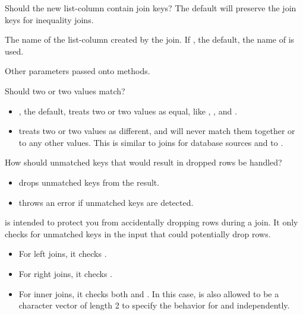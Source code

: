 \documentclass[a4paper]{book}
\begin{document}
\begin{Arguments}
\begin{ldescription}
\item[\code{keep}] Should the new list-column contain join keys? The default
will preserve the join keys for inequality joins.

\item[\code{name}] The name of the list-column created by the join. If ,
the default, the name of  is used.

\item[\code{...}] Other parameters passed onto methods.

\item[\code{na\_matches}] Should two  or two  values match?
\begin{itemize}

\item{} , the default, treats two  or two  values as equal, like
, , and .
\item{}  treats two  or two  values as different, and will
never match them together or to any other values. This is similar to joins
for database sources and to .

\end{itemize}


\item[\code{unmatched}] How should unmatched keys that would result in dropped rows
be handled?
\begin{itemize}

\item{}  drops unmatched keys from the result.
\item{}  throws an error if unmatched keys are detected.

\end{itemize}


 is intended to protect you from accidentally dropping rows
during a join. It only checks for unmatched keys in the input that could
potentially drop rows.
\begin{itemize}

\item{} For left joins, it checks .
\item{} For right joins, it checks .
\item{} For inner joins, it checks both  and . In this case,  is
also allowed to be a character vector of length 2 to specify the behavior
for  and  independently.

\end{itemize}

\end{ldescription}
\end{Arguments}
\end{document}
